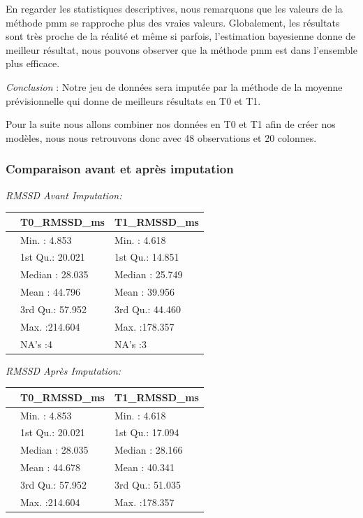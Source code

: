 \documentclass[]{article}
\begin{document}
En regarder les statistiques descriptives, nous remarquons que les
valeurs de la méthode pmm se rapproche plus des vraies valeurs.
Globalement, les résultats sont très proche de la réalité et même si
parfois, l'estimation bayesienne donne de meilleur résultat, nous
pouvons observer que la méthode pmm est dans l'ensemble plus efficace.

\emph{Conclusion} : Notre jeu de données sera imputée par la méthode de
la moyenne prévisionnelle qui donne de meilleurs résultats en T0 et T1.

Pour la suite nous allons combiner nos données en T0 et T1 afin de créer
nos modèles, nous nous retrouvons donc avec 48 observations et 20
colonnes.

\hypertarget{comparaison-avant-et-apres-imputation}{%
\subsubsection{Comparaison avant et après
imputation}\label{comparaison-avant-et-apres-imputation}}

\emph{RMSSD Avant Imputation:}

\begin{table}[H]
\centering
\begin{tabular}{l|l|l}
\hline
  &  T0\_RMSSD\_ms &  T1\_RMSSD\_ms\\
\hline
 & Min.   :  4.853 & Min.   :  4.618\\
\hline
 & 1st Qu.: 20.021 & 1st Qu.: 14.851\\
\hline
 & Median : 28.035 & Median : 25.749\\
\hline
 & Mean   : 44.796 & Mean   : 39.956\\
\hline
 & 3rd Qu.: 57.952 & 3rd Qu.: 44.460\\
\hline
 & Max.   :214.604 & Max.   :178.357\\
\hline
 & NA's   :4 & NA's   :3\\
\hline
\end{tabular}
\end{table}

\emph{RMSSD Après Imputation:}

\begin{table}[H]
\centering
\begin{tabular}{l|l|l}
\hline
  &  T0\_RMSSD\_ms &  T1\_RMSSD\_ms\\
\hline
 & Min.   :  4.853 & Min.   :  4.618\\
\hline
 & 1st Qu.: 20.021 & 1st Qu.: 17.094\\
\hline
 & Median : 28.035 & Median : 28.166\\
\hline
 & Mean   : 44.678 & Mean   : 40.341\\
\hline
 & 3rd Qu.: 57.952 & 3rd Qu.: 51.035\\
\hline
 & Max.   :214.604 & Max.   :178.357\\
\hline
\end{tabular}
\end{table}
\end{document}
